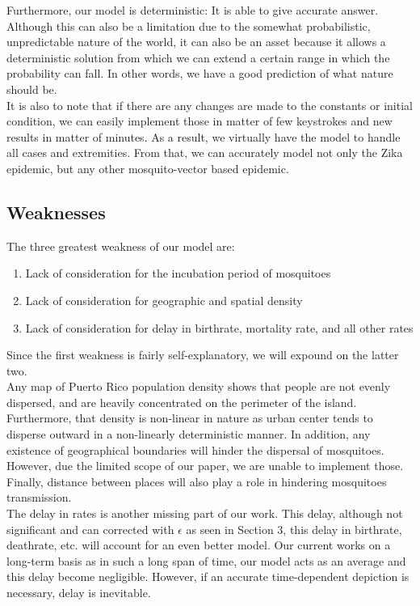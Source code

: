 \documentclass{article}
\begin{document}
Furthermore, our model is deterministic: It is able to give accurate answer. Although this can also be a limitation due to the somewhat probabilistic, unpredictable nature of the world, it can also be an asset because it allows a deterministic solution from which we can extend a certain range in which the probability can fall. In other words, we have a good prediction of what nature should be.\\

It is also to note that if there are any changes are made to the constants or initial condition, we can easily implement those in matter of few keystrokes and new results in matter of minutes. As a result, we virtually have the model to handle all cases and extremities. From that, we can accurately model not only the Zika epidemic, but any other mosquito-vector based epidemic.\\
\subsection{Weaknesses}
The three greatest weakness of our model are:
\begin{enumerate}
    \item Lack of consideration for the incubation period of mosquitoes
    \item Lack of consideration for geographic and spatial density
    \item Lack of consideration for delay in birthrate, mortality rate, and all other rates
\end{enumerate}
Since the first weakness is fairly self-explanatory, we will expound on the latter two.\\

Any map of Puerto Rico population density shows that people are not evenly dispersed, and are heavily concentrated on the perimeter of the island. Furthermore, that density is non-linear in nature as urban center tends to disperse outward in a non-linearly deterministic manner. In addition, any existence of geographical boundaries will hinder the dispersal of mosquitoes. However, due the limited scope of our paper, we are unable to implement those. Finally, distance between places will also play a role in hindering mosquitoes transmission.\\

The delay in rates is another missing part of our work. This delay, although not significant and can corrected with $\epsilon$ as seen in Section 3, this delay in birthrate, deathrate, etc. will account for an even better model. Our current works on a long-term basis as in such a long span of time, our model acts as an average and this delay become negligible. However, if an accurate time-dependent depiction is necessary, delay is inevitable.\\
\end{document}
